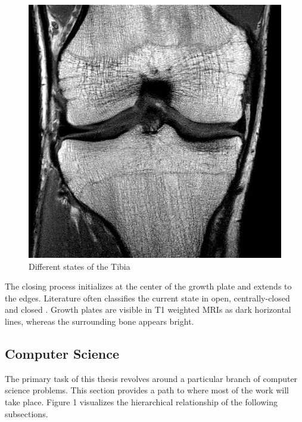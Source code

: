 \begin{figure}[!htb]
\endminipage\hfill
{}%
  \includegraphics[width=\linewidth]{imgs/closed-18y.jpg}
\endminipage
\caption{Different states of the Tibia}
\end{figure}

The closing process initializes at the center of the growth plate and extends to the edges. Literature often classifies the current state in open, centrally-closed and closed \cite{Mauer2015}. Growth plates are visible in T1 weighted MRIs as dark horizontal lines, whereas the surrounding bone appears bright.

\subsection{Computer Science}

The primary task of this thesis revolves around a particular branch of computer science problems. This section provides a path to where most of the work will take place. Figure 1 visualizes the hierarchical relationship of the following subsections.

